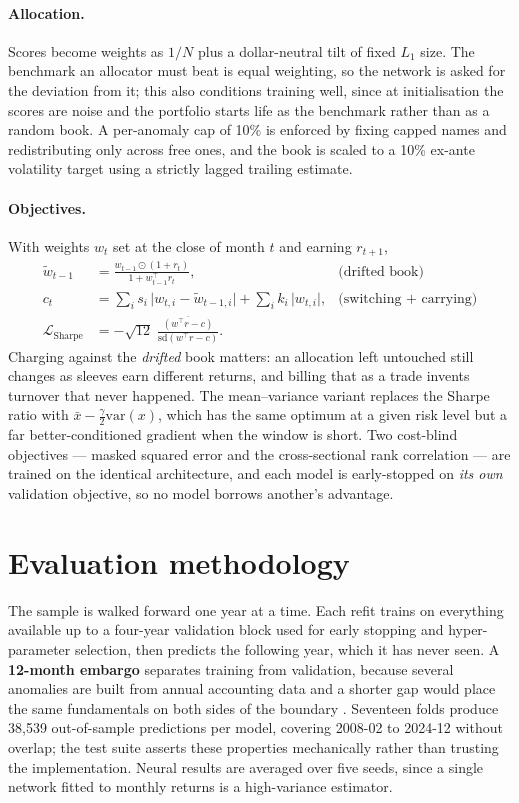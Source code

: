 \documentclass[11pt,a4paper]{article}
\begin{document}
\paragraph{Allocation.} Scores become weights as $1/N$ plus a dollar-neutral tilt
of fixed $L_1$ size. The benchmark an allocator must beat is equal weighting, so
the network is asked for the deviation from it; this also conditions training
well, since at initialisation the scores are noise and the portfolio starts life
as the benchmark rather than as a random book. A per-anomaly cap of 10\% is
enforced by fixing capped names and redistributing only across free ones, and the
book is scaled to a 10\% ex-ante volatility target using a strictly lagged
trailing estimate.

\paragraph{Objectives.} With weights $w_t$ set at the close of month $t$ and
earning $r_{t+1}$,
\begin{align}
\tilde w_{t-1} &= \frac{w_{t-1}\odot(1+r_t)}{1 + w_{t-1}^\top r_t},
&\text{(drifted book)}\\
c_t &= \textstyle\sum_i s_i\,\lvert w_{t,i}-\tilde w_{t-1,i}\rvert
      + \sum_i k_i\,\lvert w_{t,i}\rvert,
&\text{(switching + carrying)}\\
\mathcal{L}_{\text{Sharpe}} &= -\sqrt{12}\;
\frac{\overline{(w^\top r - c)}}{\mathrm{sd}(w^\top r - c)} .
\end{align}
Charging against the \emph{drifted} book matters: an allocation left untouched
still changes as sleeves earn different returns, and billing that as a trade
invents turnover that never happened. The mean--variance variant replaces the
Sharpe ratio with $\bar{x}-\tfrac{\gamma}{2}\mathrm{var}(x)$, which has the same
optimum at a given risk level but a far better-conditioned gradient when the
window is short. Two cost-blind objectives --- masked squared error and the
cross-sectional rank correlation --- are trained on the identical architecture, and
each model is early-stopped on \emph{its own} validation objective, so no model
borrows another's advantage.

\section{Evaluation methodology}

The sample is walked forward one year at a time. Each refit trains on everything
available up to a four-year validation block used for early stopping and
hyper-parameter selection, then predicts the following year, which it has never
seen. A \textbf{12-month embargo} separates training from validation, because
several anomalies are built from annual accounting data and a shorter gap would
place the same fundamentals on both sides of the boundary \citep{LopezDePrado2018}.
Seventeen folds produce 38{,}539 out-of-sample predictions per model, covering
2008-02 to 2024-12 without overlap; the test suite asserts these properties
mechanically rather than trusting the implementation. Neural results are averaged
over five seeds, since a single network fitted to monthly returns is a
high-variance estimator.
\end{document}
